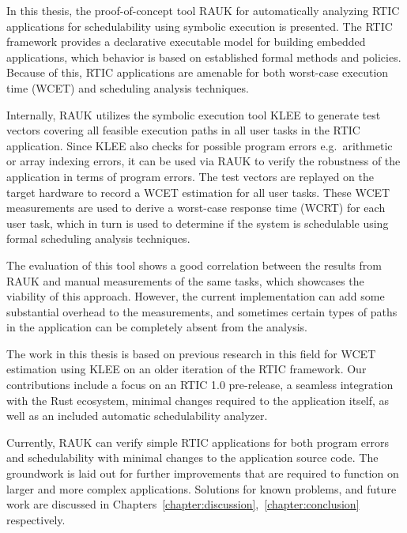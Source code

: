 In this thesis, the proof-of-concept tool RAUK for automatically analyzing
RTIC applications for schedulability using symbolic execution is presented.
The RTIC framework provides a declarative executable model for building
embedded applications, which behavior is based on established formal methods
and policies. Because of this, RTIC applications are amenable for both
worst-case execution time (WCET) and scheduling analysis techniques.

Internally, RAUK utilizes the symbolic execution tool KLEE to generate test
vectors covering all feasible execution paths in all user tasks in the RTIC
application. Since KLEE also checks for possible program errors e.g.\
arithmetic or array indexing errors, it can be used via RAUK to verify the
robustness of the application in terms of program errors. The test vectors are
replayed on the target hardware to record a WCET estimation for all user tasks.
These WCET measurements are used to derive a worst-case response time (WCRT)
for each user task, which in turn is used to determine if the system is
schedulable using formal scheduling analysis techniques.

The evaluation of this tool shows a good correlation between the results from
RAUK and manual measurements of the same tasks, which showcases the viability
of this approach. However, the current implementation can add some substantial
overhead to the measurements, and sometimes certain types of paths in the
application can be completely absent from the analysis.

The work in this thesis is based on previous research in this field for WCET
estimation using KLEE on an older iteration of the RTIC framework. Our
contributions include a focus on an RTIC 1.0 pre-release, a seamless
integration with the Rust ecosystem, minimal changes required to the
application itself, as well as an included automatic schedulability analyzer.

Currently, RAUK can verify simple RTIC applications for both program errors and
schedulability with minimal changes to the application source code. The
groundwork is laid out for further improvements that are required to function
on larger and more complex applications. Solutions for known problems, and future work
are discussed in Chapters~\ref{chapter:discussion},~\ref{chapter:conclusion} respectively.

